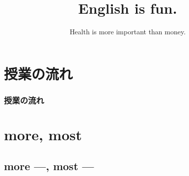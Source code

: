 \documentclass[aspectratio=169,xcolor={dvipsnames,table}]{beamer}
\title{English is fun.}
\subtitle{Health is more important than money.}
\author{}
\institute[]{}
\date[]
\begin{document}
\begin{frame}[plain]
  \titlepage
\end{frame}

\section*{授業の流れ}
\begin{frame}[plain]
  \frametitle{授業の流れ}
  \tableofcontents
\end{frame}

\section{more, most}
\subsection{more ---, most ---}
\end{document}
